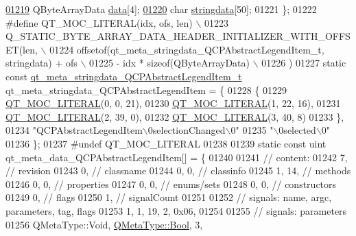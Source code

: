 \begin{DoxyCode}
\hypertarget{a00067_source_l01219}{}\hyperlink{a00067_a98fcd80c37c93a0b0b71f18405466d42}{01219}     QByteArrayData \hyperlink{a00067_a98fcd80c37c93a0b0b71f18405466d42}{data}[4];
\hypertarget{a00067_source_l01220}{}\hyperlink{a00067_a007f69edf60f3475c27481b80fb00e7f}{01220}     \textcolor{keywordtype}{char} \hyperlink{a00067_a007f69edf60f3475c27481b80fb00e7f}{stringdata}[50];
01221 \};
01222 \textcolor{preprocessor}{#define QT\_MOC\_LITERAL(idx, ofs, len) \(\backslash\)}
01223 \textcolor{preprocessor}{    Q\_STATIC\_BYTE\_ARRAY\_DATA\_HEADER\_INITIALIZER\_WITH\_OFFSET(len, \(\backslash\)}
01224 \textcolor{preprocessor}{    offsetof(qt\_meta\_stringdata\_QCPAbstractLegendItem\_t, stringdata) + ofs \(\backslash\)}
01225 \textcolor{preprocessor}{        - idx * sizeof(QByteArrayData) \(\backslash\)}
01226 \textcolor{preprocessor}{    )}
01227 \textcolor{keyword}{static} \textcolor{keyword}{const} \hyperlink{a00067_d9/dd0/a00191}{qt\_meta\_stringdata\_QCPAbstractLegendItem\_t} 
      qt\_meta\_stringdata\_QCPAbstractLegendItem = \{
01228     \{
01229 \hyperlink{a00067_a75bb9482d242cde0a06c9dbdc6b83abe}{QT\_MOC\_LITERAL}(0, 0, 21),
01230 \hyperlink{a00067_a75bb9482d242cde0a06c9dbdc6b83abe}{QT\_MOC\_LITERAL}(1, 22, 16),
01231 \hyperlink{a00067_a75bb9482d242cde0a06c9dbdc6b83abe}{QT\_MOC\_LITERAL}(2, 39, 0),
01232 \hyperlink{a00067_a75bb9482d242cde0a06c9dbdc6b83abe}{QT\_MOC\_LITERAL}(3, 40, 8)
01233     \},
01234     \textcolor{stringliteral}{"QCPAbstractLegendItem\(\backslash\)0selectionChanged\(\backslash\)0"}
01235     \textcolor{stringliteral}{"\(\backslash\)0selected\(\backslash\)0"}
01236 \};
01237 \textcolor{preprocessor}{#undef QT\_MOC\_LITERAL}
01238 
01239 \textcolor{keyword}{static} \textcolor{keyword}{const} uint qt\_meta\_data\_QCPAbstractLegendItem[] = \{
01240 
01241  \textcolor{comment}{// content:}
01242        7,       \textcolor{comment}{// revision}
01243        0,       \textcolor{comment}{// classname}
01244        0,    0, \textcolor{comment}{// classinfo}
01245        1,   14, \textcolor{comment}{// methods}
01246        0,    0, \textcolor{comment}{// properties}
01247        0,    0, \textcolor{comment}{// enums/sets}
01248        0,    0, \textcolor{comment}{// constructors}
01249        0,       \textcolor{comment}{// flags}
01250        1,       \textcolor{comment}{// signalCount}
01251 
01252  \textcolor{comment}{// signals: name, argc, parameters, tag, flags}
01253        1,    1,   19,    2, 0x06,
01254 
01255  \textcolor{comment}{// signals: parameters}
01256     QMetaType::Void, \hyperlink{a00004_a76a8b016e5ad61faf9062cc387df5016}{QMetaType::Bool},    3,

\end{DoxyCode}

